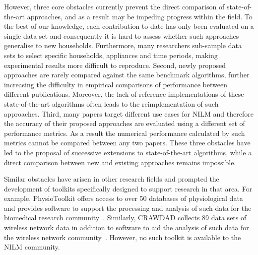 \documentclass{sig-alternate}
\begin{document}
However, three core obstacles currently prevent the direct comparison of state-of-the-art approaches, and as a result may be impeding progress within the field. To the best of our knowledge, each contribution to date has only been evaluated on a single data set and consequently it is hard to assess whether such approaches generalise to new households. Furthermore, many researchers sub-sample data sets to select specific households, appliances and time periods, making experimental results more difficult to reproduce. Second, newly proposed approaches are rarely compared against the same benchmark algorithms, further increasing the difficulty in empirical comparisons of performance between different publications. Moreover, the lack of reference implementations of these state-of-the-art algorithms often leads to the reimplementation of such approaches. Third, many papers target different use cases for NILM and therefore the accuracy of their proposed approaches are evaluated using a different set of performance metrics. As a result the numerical performance calculated by such metrics cannot be compared between any two papers. These three obstacles have led to the proposal of successive extensions to state-of-the-art algorithms, while a direct comparison between new and existing approaches remains impossible.

Similar obstacles have arisen in other research fields and prompted the development of toolkits specifically designed to support research in that area. For example, PhysioToolkit offers access to over 50 databases of physiological data and provides software to support the processing and analysis of such data for the biomedical research community~\cite{physionet}. Similarly, CRAWDAD collects 89 data sets of wireless network data in addition to software to aid the analysis of such data for the wireless network community~\cite{crawdad}. However, no such toolkit is available to the NILM community.
\end{document}
